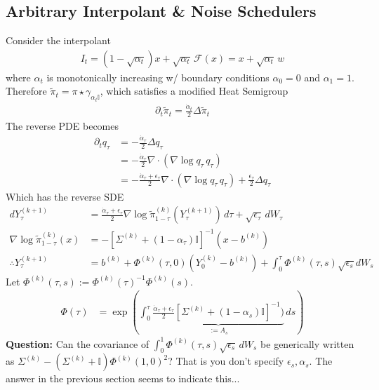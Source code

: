 \documentclass[12pt,fleqn]{article}
\numberwithin{equation}{section}
\begin{document}
\subsection{Arbitrary Interpolant \& Noise Schedulers}
Consider the interpolant
\begin{align}
	I_t = (1 - \sqrt{\alpha_t}) x + \sqrt{\alpha_t} \, \mathcal F(x) = x +\sqrt{\alpha_t} \, w
\end{align}
where $\alpha_t$ is monotonically increasing w/ boundary conditions $\alpha_{0} = 0$ and $\alpha_1 = 1$. Therefore $\tilde \pi_t = \pi \star \gamma_{\alpha_t \mathbb I}$, which satisfies a modified Heat Semigroup
\begin{align}
	\partial_t \tilde \pi_t = \frac{\dot \alpha_t }{2} \Delta \tilde \pi_t
\end{align}
The reverse PDE becomes
\begin{align}
	\partial_t q_\tau & = - \frac{\dot \alpha_\tau}{2} \Delta q_\tau\\
	& = - \frac{\dot \alpha_\tau}{2}  \nabla \cdot (\nabla \log q_\tau \, q_\tau) \\
	& = - \frac{\dot \alpha_\tau + \epsilon_\tau}{2} \nabla \cdot (\nabla \log q_\tau \, q_\tau) + \frac{\epsilon_\tau}{2} \Delta q_\tau
\end{align}
Which has the reverse SDE
\begin{align}
	dY_\tau^{(k+1)} & = \frac{\dot \alpha_{\tau} + \epsilon_\tau}{2} \nabla \log \tilde \pi_{1-\tau}^{(k)} (Y_\tau^{(k+1)}) \, d\tau + \sqrt{\epsilon_\tau} \, dW_\tau\\
	\nabla \log \tilde \pi_{1-\tau}^{(k)} (x)  &  =  - [\Sigma^{(k)} + (1-\alpha_\tau) \mathbb I]^{-1} (x - b^{(k)})\\
	\therefore Y_{\tau}^{(k+1)} & = b^{(k)} + \Phi^{(k)}(\tau, 0) (Y_0^{(k)} - b^{(k)}) + \int_0^\tau \Phi^{(k)} (\tau, s)\sqrt{\epsilon_s} dW_s
\end{align}
Let $\Phi^{(k)}(\tau, s) := \Phi^{(k)}(\tau)^{-1} \Phi^{(k)}(s)$.
\begin{align}
	\Phi(\tau) & = \exp \left( \int_0^\tau \underbrace{\frac{\dot \alpha_{\tau} + \epsilon_\tau}{2} [\Sigma^{(k)} + (1-\alpha_s) \mathbb I]^{-1} )}_{:= A_s}\, ds\right)
\end{align}
\textbf{Question:} Can the covariance of $\int_0^1 \Phi^{(k)} (\tau, s) \sqrt{\epsilon_s} \, dW_s$ be generically written as $\Sigma^{(k)} - (\Sigma^{(k)} + \mathbb I) \Phi^{(k)}(1,0)^2$? That is you don't specify $\epsilon_s,\alpha_s$. The answer in the previous section seems to indicate this...
\end{document}
